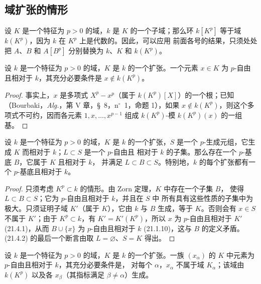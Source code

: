 \subsection{域扩张的情形}
\label{0.21.4-fr}

\begin{env}[21.4.0]
\label{0.21.4.0-fr}
设 $K$ 是一个特征为 $p>0$ 的域，$k$ 是 $K$ 的一个子域；那么环
$k[K^p]$ 等于域 $k(K^p)$，因为 $k$ 在 $K^p$ 上是代数的。因此，可以应用
前面各号的结果，只须处处把 $A$、$B$ 和 $A[B^p]$ 分别替换为 $k$、$K$ 和
$k(K^p)$。
\end{env}

\begin{lemma}[21.4.1]
\label{0.21.4.1-fr}
设 $k$ 是一个特征为 $p>0$ 的域，$K$ 是 $k$ 的一个扩张。一个元素
$x\in K$ 为 $p$-自由且相对于 $k$，其充分必要条件是 $x\notin k(K^p)$。
\end{lemma}

\begin{proof}
事实上，$x$ 是多项式 $X^p-x^p$（属于 $k(K^p)[X]$）的一个根；已知
（Bourbaki，\emph{Alg.}，第 V 章，§~8，n$^\circ$~1，命题 1），如果
$x\notin k(K^p)$，则这个多项式不可约，因而各元素
$1,x,\ldots,x^{p-1}$ 组成 $k(K^p)$-模 $k(K^p)(x)$ 的一组基。
\end{proof}

\begin{theorem}[21.4.2]
\label{0.21.4.2-fr}
设 $k$ 是一个特征为 $p>0$ 的域，$K$ 是 $k$ 的一个扩张，$S$ 是一个
$p$-生成元组，它生成 $K$ 而相对于 $k$；$L\subset S$ 是一个 $p$-自由且
相对于 $k$ 的子集。那么存在一个 $p$-基底 $B$，它属于 $K$ 且相对于 $k$，
并满足 $L\subset B\subset S$。特别地，$k$ 的每个扩张都有一个
$p$-基底且相对于 $k$。
\end{theorem}

\begin{proof}
只须考虑 $K^p\subset k$ 的情形。由 Zorn 定理，$K$ 中存在一个子集 $B$，
使得 $L\subset B\subset S$；它为 $p$-自由且相对于 $k$，并且在 $S$ 中
所有具有这些性质的子集中为极大。只须证明子域 $K'$（属于 $K$），它由
$k$ 与 $B$ 生成，等于 $K$。否则会有 $x\in S$ 不属于 $K'$；由于
$K^p\subset k$，有 $K'=K'(K^p)$，所以 $x$ 为 $p$-自由且相对于 $K'$
(21.4.1)，从而 $B\cup\{x\}$ 为 $p$-自由且相对于 $k$ (21.1.10)，这与
$B$ 的定义矛盾。
(21.4.2) 的最后一个断言由取 $L=\varnothing$、$S=K$ 得出。
\end{proof}

\begin{corollary}[21.4.3]
\label{0.21.4.3-fr}
设 $k$ 是一个特征为 $p>0$ 的域，$K$ 是 $k$ 的一个扩张。一族
$(x_\alpha)$ 的 $K$ 中元素为 $p$-自由且相对于 $k$，其充分必要条件是，
对每个 $\alpha$，$x_\alpha$ 不属于域 $K_\alpha$；该域由 $k(K^p)$ 以及各
$x_\beta$（其指标满足 $\beta\neq\alpha$）生成。
\end{corollary}

